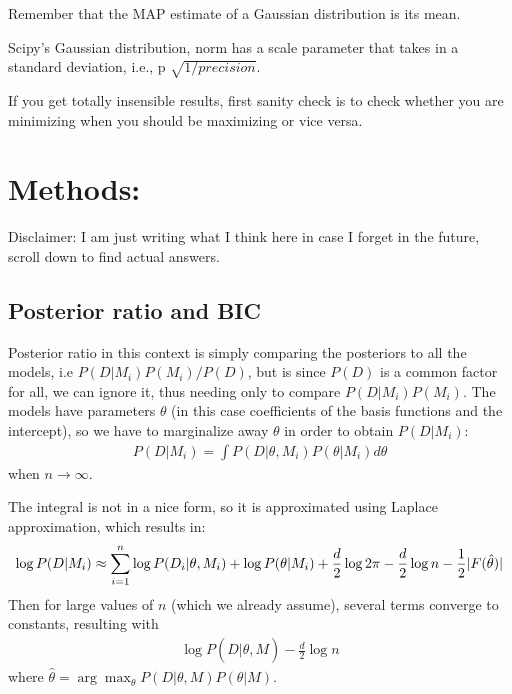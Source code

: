\documentclass[12pt]{article}
\begin{document}
\begin{tcolorbox}[breakable]
    \vspace{3mm}
    Remember that the MAP estimate of a Gaussian distribution is its mean. 

    \vspace{3mm}
    Scipy's Gaussian distribution, norm has a scale parameter that takes in a standard deviation, i.e., p $\sqrt{1/precision}$. 

    \vspace{3mm}
    If you get totally insensible results, first sanity check is to check whether you are minimizing when you should be maximizing or vice versa.
\end{tcolorbox}
\section*{Methods:}
    Disclaimer: I am just writing what I think here in case I forget in the future, scroll down to find actual answers.
    \subsection*{Posterior ratio and BIC}
    Posterior ratio in this context is simply comparing the posteriors to all the models, i.e
    $P(D|M_i)P(M_i) / P(D)$, but is since $P(D)$ is a common factor for all, we can ignore it, thus needing only to compare $P(D|M_i)P(M_i)$. The models have parameters $\theta$ (in this case coefficients of the basis functions and the intercept), so we have to marginalize away $\theta$ in order to obtain $P(D|M_i)$: 
    \begin{align}
        P(D|M_i) = \int P(D|\theta, M_i)P(\theta|M_i)d\theta
    \end{align}
    when $n \rightarrow \infty$.

    \noindent The integral is not in a nice form, so it is approximated using Laplace approximation, which results in:
    \begin{align}
        \log P(D|M_i) \approx \sum\limits_{i=1}^{n} \log P(D_i|\theta,M_i) + \log P(\theta|M_i) + \frac{d}{2}\log 2\pi - \frac{d}{2} \log n - \frac{1}{2} |F(\hat{\theta})| 
    \end{align}
    Then for large values of $n$ (which we already assume), several terms converge to constants, resulting with 
    \begin{align}
        \log P(D|\hat{\theta}, M) - \frac{d}{2}\log n \label{eq:bic}
    \end{align}
    where $\hat{\theta} = \arg\max_\theta P(D|\theta,M)P(\theta|M).$ 
\end{document}
